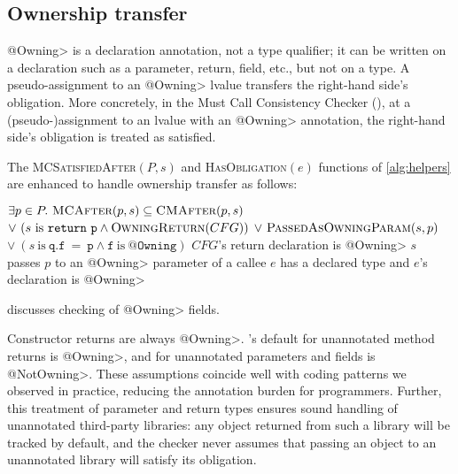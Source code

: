 \subsection{Ownership transfer}
\label{sec:ownership-transfer}

\<@Owning> is a declaration annotation, not a type qualifier; it can be
written on a declaration such as a parameter, return, field, etc., but not
on a type.
A pseudo-assignment to an \<@Owning> lvalue transfers the right-hand side's
\MustCall obligation.
More concretely, in the Must Call Consistency Checker
(), at a (pseudo-)assignment to an lvalue with
an \<@Owning> annotation, the right-hand side's
\MustCall obligation is treated as satisfied.

The \textsc{MCSatisfiedAfter}$(P,s)$ and \textsc{HasObligation}$(e)$ functions 
of \cref{alg:helpers} are enhanced to handle ownership transfer as follows:
\begin{algorithmic}
  \State \Return $\exists p \in P .\ \textsc{MCAfter}(p,s) \subseteq \textsc{CMAfter}(p,s)$ \newline
  \hspace*{6em} $\vee\ (s \mathrm{\ is\ } \mathtt{return\ p} \wedge \textsc{OwningReturn}(CFG))$ \newline
  \hspace*{6em} $\vee\ \textsc{PassedAsOwningParam}(s,p)$\newline
  \hspace*{6em} $\vee\ (s \mathrm{\ is\ } \mathtt{q.f\ =\ p} \wedge \mathtt{f} \mathrm{\ is\ } \mathtt{@Owning})$
  \EndProcedure
  \State \Return $CFG$'s return declaration is \<@Owning>
  \EndProcedure
  \State \Return $s$ passes $p$ to an \<@Owning> parameter of a callee
  \EndProcedure
  \State \Return $e$ has a declared \MustCall type and $e$'s declaration is \<@Owning>
  \EndProcedure
\end{algorithmic}
 discusses checking of \<@Owning> fields.

Constructor returns are always \<@Owning>.
\Tool's default for unannotated method returns is \<@Owning>,
and for unannotated parameters and fields is \<@NotOwning>.  These assumptions
coincide well with coding patterns we observed in practice, reducing the
annotation burden for programmers.  Further, this treatment of parameter and
return types ensures sound handling of unannotated third-party libraries: any
object returned from such a library will be tracked by default, and the checker
never assumes that passing an object to an unannotated library will satisfy its obligation.


